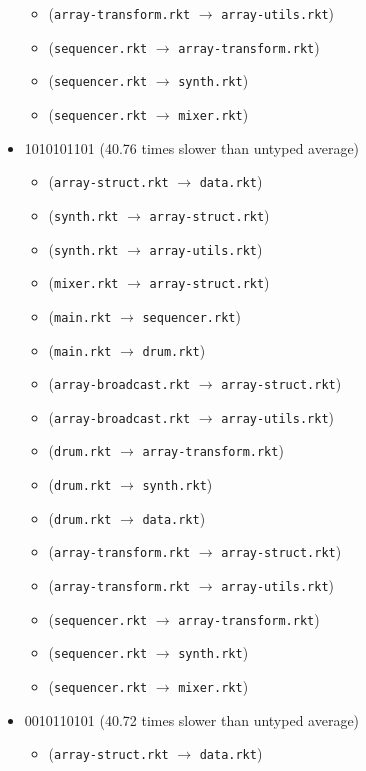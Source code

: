 \documentclass{article}
\newcommand{\mono}[1]{\texttt{#1}}
\begin{document}
\begin{itemize}
\begin{itemize}
  \item (\mono{array-transform.rkt} $\rightarrow$ \mono{array-utils.rkt})
  \item (\mono{sequencer.rkt} $\rightarrow$ \mono{array-transform.rkt})
  \item (\mono{sequencer.rkt} $\rightarrow$ \mono{synth.rkt})
  \item (\mono{sequencer.rkt} $\rightarrow$ \mono{mixer.rkt})
  \end{itemize}
\item 1010101101 (40.76 times slower than untyped average)
  \begin{itemize}
  \item (\mono{array-struct.rkt} $\rightarrow$ \mono{data.rkt})
  \item (\mono{synth.rkt} $\rightarrow$ \mono{array-struct.rkt})
  \item (\mono{synth.rkt} $\rightarrow$ \mono{array-utils.rkt})
  \item (\mono{mixer.rkt} $\rightarrow$ \mono{array-struct.rkt})
  \item (\mono{main.rkt} $\rightarrow$ \mono{sequencer.rkt})
  \item (\mono{main.rkt} $\rightarrow$ \mono{drum.rkt})
  \item (\mono{array-broadcast.rkt} $\rightarrow$ \mono{array-struct.rkt})
  \item (\mono{array-broadcast.rkt} $\rightarrow$ \mono{array-utils.rkt})
  \item (\mono{drum.rkt} $\rightarrow$ \mono{array-transform.rkt})
  \item (\mono{drum.rkt} $\rightarrow$ \mono{synth.rkt})
  \item (\mono{drum.rkt} $\rightarrow$ \mono{data.rkt})
  \item (\mono{array-transform.rkt} $\rightarrow$ \mono{array-struct.rkt})
  \item (\mono{array-transform.rkt} $\rightarrow$ \mono{array-utils.rkt})
  \item (\mono{sequencer.rkt} $\rightarrow$ \mono{array-transform.rkt})
  \item (\mono{sequencer.rkt} $\rightarrow$ \mono{synth.rkt})
  \item (\mono{sequencer.rkt} $\rightarrow$ \mono{mixer.rkt})
  \end{itemize}
\item 0010110101 (40.72 times slower than untyped average)
  \begin{itemize}
  \item (\mono{array-struct.rkt} $\rightarrow$ \mono{data.rkt})

\end{itemize}
\end{itemize}
\end{document}
